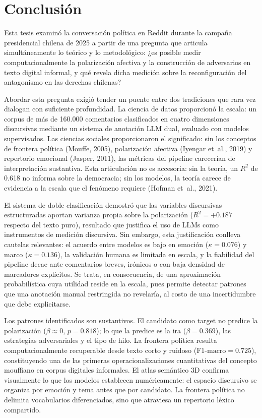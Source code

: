 \documentclass[
  letterpaper,
  numbers=noendperiod,
  fontsize=11pt,
  DIV=12,
  titlepage=false]{scrreprt}
\begin{document}

\chapter{Conclusión}\label{conclusiuxf3n}

Esta tesis examinó la conversación política en Reddit durante la campaña
presidencial chilena de 2025 a partir de una pregunta que articula
simultáneamente lo teórico y lo metodológico: ¿es posible medir
computacionalmente la polarización afectiva y la construcción de
adversarios en texto digital informal, y qué revela dicha medición sobre
la reconfiguración del antagonismo en las derechas chilenas?

Abordar esta pregunta exigió tender un puente entre dos tradiciones que
rara vez dialogan con suficiente profundidad. La ciencia de datos
proporcionó la escala: un corpus de más de 160.000 comentarios
clasificados en cuatro dimensiones discursivas mediante un sistema de
anotación LLM dual, evaluado con modelos supervisados. Las ciencias
sociales proporcionaron el significado: sin los conceptos de frontera
política (Mouffe, 2005), polarización afectiva (Iyengar et~al., 2019) y
repertorio emocional (Jasper, 2011), las métricas del pipeline
carecerían de interpretación sustantiva. Esta articulación no es
accesoria: sin la teoría, un \(R^2\) de 0.618 no informa sobre la
democracia; sin los modelos, la teoría carece de evidencia a la escala
que el fenómeno requiere (Hofman et~al., 2021).

El sistema de doble clasificación demostró que las variables discursivas
estructuradas aportan varianza propia sobre la polarización
(\(R^2 = +0.187\) respecto del texto puro), resultado que justifica el
uso de LLMs como instrumentos de medición discursiva. Sin embargo, esta
justificación conlleva cautelas relevantes: el acuerdo entre modelos es
bajo en emoción (\(\kappa = 0.076\)) y marco (\(\kappa = 0.136\)), la
validación humana es limitada en escala, y la fiabilidad del pipeline
decae ante comentarios breves, irónicos o con baja densidad de
marcadores explícitos. Se trata, en consecuencia, de una aproximación
probabilística cuya utilidad reside en la escala, pues permite detectar
patrones que una anotación manual restringida no revelaría, al costo de
una incertidumbre que debe explicitarse.

Los patrones identificados son sustantivos. El candidato como target no
predice la polarización (\(\beta \approx 0\), \(p = 0.818\)); lo que la
predice es la ira (\(\beta = 0.369\)), las estrategias adversariales y
el tipo de hilo. La frontera política resulta computacionalmente
recuperable desde texto corto y ruidoso (\(\mbox{F1-macro} = 0.725\)),
constituyendo una de las primeras operacionalizaciones cuantitativas del
concepto mouffiano en corpus digitales informales. El atlas semántico 3D
confirma visualmente lo que los modelos establecen numéricamente: el
espacio discursivo se organiza por emoción y tema antes que por
candidato. La frontera política no delimita vocabularios diferenciados,
sino que atraviesa un repertorio léxico compartido.
\end{document}
